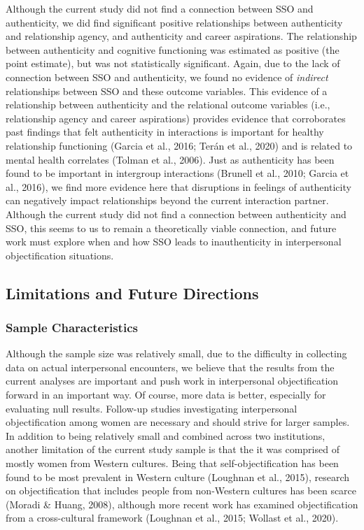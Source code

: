 \documentclass[man]{apa6}
\begin{document}
Although the current study did not find a connection between SSO and
authenticity, we did find significant positive relationships between
authenticity and relationship agency, and authenticity and career
aspirations. The relationship between authenticity and cognitive
functioning was estimated as positive (the point estimate), but was not
statistically significant. Again, due to the lack of connection between
SSO and authenticity, we found no evidence of \emph{indirect}
relationships between SSO and these outcome variables. This evidence of
a relationship between authenticity and the relational outcome variables
(i.e., relationship agency and career aspirations) provides evidence
that corroborates past findings that felt authenticity in interactions
is important for healthy relationship functioning (Garcia et al., 2016;
Terán et al., 2020) and is related to mental health correlates (Tolman
et al., 2006). Just as authenticity has been found to be important in
intergroup interactions (Brunell et al., 2010; Garcia et al., 2016), we
find more evidence here that disruptions in feelings of authenticity can
negatively impact relationships beyond the current interaction partner.
Although the current study did not find a connection between
authenticity and SSO, this seems to us to remain a theoretically viable
connection, and future work must explore when and how SSO leads to
inauthenticity in interpersonal objectification situations.

\subsection{Limitations and Future
Directions}\label{limitations-and-future-directions}

\subsubsection{Sample Characteristics}\label{sample-characteristics}

Although the sample size was relatively small, due to the difficulty in
collecting data on actual interpersonal encounters, we believe that the
results from the current analyses are important and push work in
interpersonal objectification forward in an important way. Of course,
more data is better, especially for evaluating null results. Follow-up
studies investigating interpersonal objectification among women are
necessary and should strive for larger samples. In addition to being
relatively small and combined across two institutions, another
limitation of the current study sample is that the it was comprised of
mostly women from Western cultures. Being that self-objectification has
been found to be most prevalent in Western culture (Loughnan et al.,
2015), research on objectification that includes people from non-Western
cultures has been scarce (Moradi \& Huang, 2008), although more recent
work has examined objectification from a cross-cultural framework
(Loughnan et al., 2015; Wollast et al., 2020).
\end{document}
